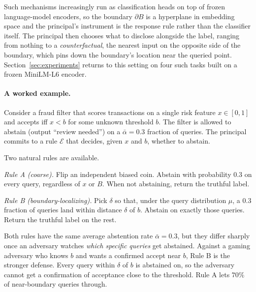 \documentclass[runningheads,envcountsame]{llncs}
\newcommand{\cE}{\mathcal{E}}
\begin{document}
Such mechanisms increasingly run as classification heads on top of frozen language-model encoders, so the boundary $\partial B$ is a hyperplane in embedding space and the principal's instrument is the response rule rather than the classifier itself. The principal then chooses what to disclose alongside the label, ranging from nothing to a \emph{counterfactual}, the nearest input on the opposite side of the boundary, which pins down the boundary's location near the queried point. Section~\ref{sec:experiments} returns to this setting on four such tasks built on a frozen MiniLM-L6 encoder.

\paragraph{A worked example.}
Consider a fraud filter that scores transactions on a single risk feature $x \in [0,1]$ and accepts iff $x < b$ for some unknown threshold $b$. The filter is allowed to abstain (output ``review needed'') on a $\bar\alpha = 0.3$ fraction of queries. The principal commits to a rule $\cE$ that decides, given $x$ and $b$, whether to abstain.

Two natural rules are available.

\emph{Rule A (coarse).} Flip an independent biased coin. Abstain with probability $0.3$ on every query, regardless of $x$ or $B$. When not abstaining, return the truthful label.

\emph{Rule B (boundary-localizing).} Pick $\delta$ so that, under the query distribution $\mu$, a $0.3$ fraction of queries land within distance $\delta$ of $b$. Abstain on exactly those queries. Return the truthful label on the rest.

Both rules have the same average abstention rate $\bar\alpha = 0.3$, but they differ sharply once an adversary watches \emph{which specific queries} get abstained.
Against a gaming adversary who knows $b$ and wants a confirmed accept near $b$, Rule B is the stronger defense. Every query within $\delta$ of $b$ is abstained on, so the adversary cannot get a confirmation of acceptance close to the threshold. Rule A lets $70\%$ of near-boundary queries through.
\end{document}
